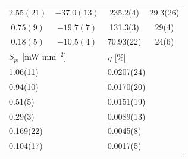 \documentclass[a4paper,10pt,twocolumn]{article}
\begin{document}
\begin{extract*}
\begin{table}[]
\begin{tabular}{@{}lclc@{}}
		\multicolumn{1}{c}{$ 2.55(21) $}                  & $ -37.0(13) $                         & \multicolumn{1}{c}{235.2(4)}    & 29.3(26)  \\
		\multicolumn{1}{c}{$ 0.75(9) $}                   & $ -19.7(7) $                          & \multicolumn{1}{c}{131.3(3)}    & 29(4)     \\
		\multicolumn{1}{c}{$ 0.18(5) $}                   & $ -10.5(4) $                          & \multicolumn{1}{c}{70.93(22)}   & 24(6)     \\ \midrule
		\multicolumn{2}{l}{$S_{pi}$ [mW mm$^{-2}$]}                                               & \multicolumn{2}{l}{$\eta$ [\%]}             \\
		\multicolumn{2}{l}{1.06(11)}                                                              & \multicolumn{2}{l}{0.0207(24)}              \\
		\multicolumn{2}{l}{0.94(10)}                                                              & \multicolumn{2}{l}{0.0170(20)}              \\
		\multicolumn{2}{l}{0.51(5)}                                                               & \multicolumn{2}{l}{0.0151(19)}              \\
		\multicolumn{2}{l}{0.29(3)}                                                               & \multicolumn{2}{l}{0.0089(13)}              \\
		\multicolumn{2}{l}{0.169(22)}                                                             & \multicolumn{2}{l}{0.0045(8)}               \\
		\multicolumn{2}{l}{0.104(17)}                                                             & \multicolumn{2}{l}{0.0017(5)}               \\ \bottomrule
	\end{tabular}
\end{table}


\end{extract*}
\end{document}
